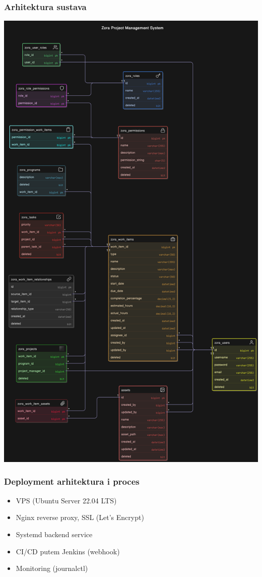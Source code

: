 \documentclass[aspectratio=169]{beamer}
\begin{document}
\begin{frame}
    \frametitle{Arhitektura sustava}
    \begin{center}
        \includegraphics[height=0.75\textheight]{../zora_diagram.png}
    \end{center}
\end{frame}

\begin{frame}
    \frametitle{Deployment arhitektura i proces}
    \begin{itemize}
        \item VPS (Ubuntu Server 22.04 LTS)
        \item Nginx reverse proxy, SSL (Let's Encrypt)
        \item Systemd backend service
        \item CI/CD putem Jenkins (webhook)
        \item Monitoring (journalctl)
    \end{itemize}
\end{frame}
\end{document}
